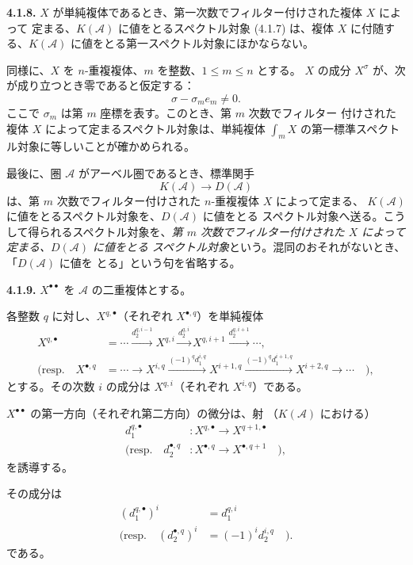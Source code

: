\clearpage
{}%
\begingroup\small\setlength{\parskip}{0pt}\setlength{\emergencystretch}{1.5em}
\setlength{\abovedisplayskip}{4pt plus 2pt minus 2pt}%
\setlength{\belowdisplayskip}{4pt plus 2pt minus 2pt}%

\noindent\textbf{4.1.8.}\quad
$X$ が単純複体であるとき、第一次数でフィルター付けされた複体 $X$ によって
定まる、$K(\mathcal A)$ に値をとるスペクトル対象 (4.1.7) は、複体 $X$
に付随する、$K(\mathcal A)$ に値をとる第一スペクトル対象にほかならない。

同様に、$X$ を $n$-重複複体、$m$ を整数、$1\leq m\leq n$ とする。
$X$ の成分 $X^\sigma$ が、次が成り立つとき零であると仮定する：
\[
\sigma-\sigma_m e_m\neq0.
\]
ここで $\sigma_m$ は第 $m$ 座標を表す。このとき、第 $m$ 次数でフィルター
付けされた複体 $X$ によって定まるスペクトル対象は、単純複体 $\int_m X$
の第一標準スペクトル対象に等しいことが確かめられる。

最後に、圏 $\mathcal A$ がアーベル圏であるとき、標準関手
\[
K(\mathcal A)\longrightarrow D(\mathcal A)
\]
は、第 $m$ 次数でフィルター付けされた $n$-重複複体 $X$ によって定まる、
$K(\mathcal A)$ に値をとるスペクトル対象を、$D(\mathcal A)$ に値をとる
スペクトル対象へ送る。こうして得られるスペクトル対象を、\emph{第 $m$
次数でフィルター付けされた $X$ によって定まる、$D(\mathcal A)$ に値をとる
スペクトル対象}という。混同のおそれがないとき、「$D(\mathcal A)$ に値を
とる」という句を省略する。

\medskip\noindent\textbf{4.1.9.}\quad
$X^{\bullet\bullet}$ を $\mathcal A$ の二重複体とする。

各整数 $q$ に対し、$X^{q,\bullet}$（それぞれ $X^{\bullet,q}$）を単純複体
\[
\begin{aligned}
X^{q,\bullet}
&=\cdots\xrightarrow{d_2^{q,i-1}}X^{q,i}
  \xrightarrow{d_2^{q,i}}X^{q,i+1}
  \xrightarrow{d_2^{q,i+1}}\cdots,\\[3pt]
(\text{resp.}\quad X^{\bullet,q}
&=\cdots\longrightarrow X^{i,q}
  \xrightarrow{(-1)^q d_1^{i,q}}X^{i+1,q}
  \xrightarrow{(-1)^q d_1^{i+1,q}}X^{i+2,q}
  \longrightarrow\cdots\quad),
\end{aligned}
\]
とする。その次数 $i$ の成分は $X^{q,i}$（それぞれ $X^{i,q}$）である。

$X^{\bullet\bullet}$ の第一方向（それぞれ第二方向）の微分は、射
（$K(\mathcal A)$ における）
\[
\begin{aligned}
d_1^{q,\bullet}&\colon X^{q,\bullet}\longrightarrow X^{q+1,\bullet}\\
(\text{resp.}\quad
d_2^{\bullet,q}&\colon X^{\bullet,q}\longrightarrow X^{\bullet,q+1}\quad),
\end{aligned}
\]
を誘導する。

その成分は
\[
\begin{aligned}
(d_1^{q,\bullet})^i&=d_1^{q,i}\\
(\text{resp.}\quad(d_2^{\bullet,q})^i&=(-1)^i d_2^{i,q}\quad).
\end{aligned}
\]
である。
\endgroup
